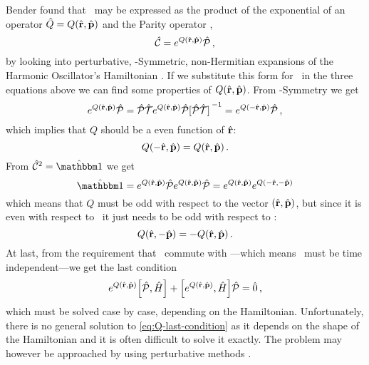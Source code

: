             Bender found that \hC\ may be expressed as the product of the exponential of an operator $\hQ = Q\pqty{\hvr,\hvp}$ and the Parity operator \hP,
            \begin{equation}
                \label{eq:C-exponential}
                \hC = \myexp{Q\pqty{\hvr,\hvp}}\hP
                \mycomma
            \end{equation}
            by looking into perturbative, \PT-Symmetric, non-Hermitian expansions of the Harmonic Oscillator's Hamiltonian \cite{bender2024}. If we substitute this form for \hC\ in the three equations above we can find some properties of $Q\pqty{\hvr,\hvp}$. From \PT-Symmetry we get
            \begin{equation*}
                \myexp{Q\pqty{\hvr,\hvp}}\hP
                = \PTtransform{\myexp{Q\pqty{\hvr,\hvp}}\hP}
                = \myexp{Q\pqty{-\hvr,\hvp}}\hP
                \mycomma
            \end{equation*}
            which implies that $Q$ should be a even function of $\hat{\vb{r}}$:
            \begin{equation}
                Q\pqty{-\hvr,\hvp} = Q\pqty{\hvr,\hvp}
                \myperiod
            \end{equation}
            From $\hC^2 = \hidM$ we get
            \begin{equation*}
                \hidM = \myexp{Q\pqty{\hvr,\hvp}} \hP \myexp{Q\pqty{\hvr,\hvp}} \hP = \myexp{Q\pqty{\hvr,\hvp}} \myexp{Q\pqty{-\hvr,-\hvp}}
            \end{equation*}
            which means that $Q$ must be odd with respect to the vector $\pqty{\hvr,\hvp}$, but since it is even with respect to \hvr\ it just needs to be odd with respect to {\hvp}:
            \begin{equation}
                Q\pqty{\hvr,-\hvp} = -Q\pqty{\hvr,\hvp}
                \myperiod
            \end{equation}
            At last, from the requirement that \hC\ commute with \hH---which means \hC\ must be time independent---we get the last condition
            \begin{equation}
                \label{eq:Q-last-condition}
                \myexp{Q\pqty{\hvr,\hvp}} \comm{\hP}{\hH} + \comm{\myexp{Q\pqty{\hvr,\hvp}}}{\hH} \hP = \hzero
                \mycomma
            \end{equation}
            which must be solved case by case, depending on the Hamiltonian. Unfortunately, there is no general solution to \eqref{eq:Q-last-condition} as it depends on the shape of the Hamiltonian and it is often difficult to solve it exactly. The problem may however be approached by using perturbative methods \cite{bender2024}.

